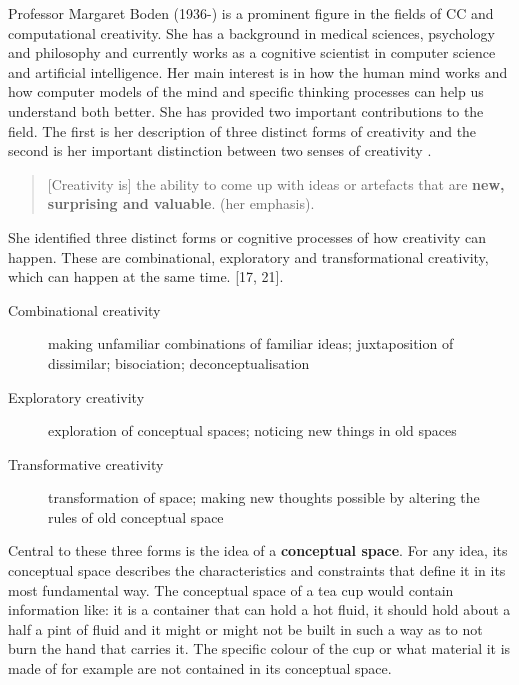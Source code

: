 Professor Margaret Boden (1936-) is a prominent figure in the fields of CC and computational creativity. She has a background in medical sciences, psychology and philosophy and currently works as a cognitive scientist in computer science and artificial intelligence. Her main interest is in how the human mind works and how computer models of the mind and specific thinking processes can help us understand both better. She has provided two important contributions to the field. The first is her description of three distinct forms of creativity and the second is her important distinction between two senses of creativity \citep{Boden2003}.

\begin{quote}
  [Creativity is] the ability to come up with ideas or artefacts that are \textbf{new, surprising and valuable}. \citep{Boden2003} (her emphasis).
\end{quote}

She identified three distinct forms or cognitive processes of how creativity can happen. These are combinational, exploratory and transformational creativity, which can happen at the same time. \citep{Boden2003}[17, 21].

\begin{description}
  \item [Combinational creativity] making unfamiliar combinations of familiar ideas; juxtaposition of dissimilar; bisociation; deconceptualisation
  \item [Exploratory creativity] exploration of conceptual spaces; noticing new things in old spaces
  \item [Transformative creativity] transformation of space; making new thoughts possible by altering the rules of old conceptual space
\end{description}

Central to these three forms is the idea of a \textbf{conceptual space}. For any idea, its conceptual space describes the characteristics and constraints that define it in its most fundamental way. The conceptual space of a tea cup would contain information like: it is a container that can hold a hot fluid, it should hold about a half a pint of fluid and it might or might not be built in such a way as to not burn the hand that carries it. The specific colour of the cup or what material it is made of for example are not contained in its conceptual space.

